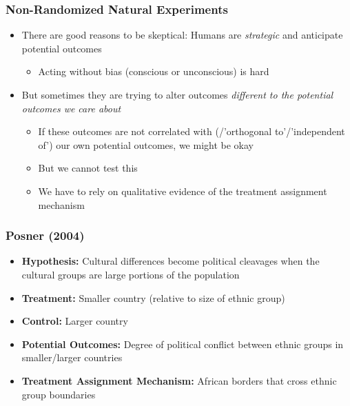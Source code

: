 \documentclass[xcolor=x11names,compress]{beamer}\usepackage[]{graphicx}\usepackage[]{color}
\renewcommand{\(}{\begin{columns}}
\renewcommand{\)}{\end{columns}}
\newcommand{\<}[1]{\begin{column}{#1}}
\renewcommand{\>}{\end{column}}
\begin{document}
\begin{frame}
\frametitle{Non-Randomized Natural Experiments}
\begin{itemize}
\item There are good reasons to be skeptical: Humans are \textit{strategic} and anticipate potential outcomes 
\begin{itemize}
\item Acting without bias (conscious or unconscious) is hard
\end{itemize}
\pause
\item But sometimes they are trying to alter outcomes \textit{different to the potential outcomes we care about}
\pause
\begin{itemize}
\item If these outcomes are not correlated with (/'orthogonal to'/'independent of') our own potential outcomes, we might be okay
\pause
\item But we cannot test this
\pause
\item We have to rely on qualitative evidence of the treatment assignment mechanism
\end{itemize}
\end{itemize}
\end{frame}

\begin{frame}
\frametitle{Posner (2004)}
\begin{itemize}
\item \textbf{Hypothesis:} Cultural differences become political cleavages when the cultural groups are large portions of the population
\pause
\item \textbf{Treatment: } Smaller country (relative to size of ethnic group)
\pause
\item \textbf{Control: } Larger country
\pause
\item \textbf{Potential Outcomes:} Degree of political conflict between ethnic groups in smaller/larger countries
\pause
\item \textbf{Treatment Assignment Mechanism:} African borders that cross ethnic group boundaries
\end{itemize}
\end{frame}
\end{document}
